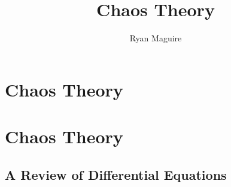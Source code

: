 \documentclass[crop=false,class=book,oneside]{standalone}
\begin{document}
    \newif\ifmathcourseschaostheory
    \ifx\ifmathcourses\undefined
        \title{Chaos Theory}
        \author{Ryan Maguire}
        \date{\vspace{-5ex}}
        \maketitle
        \tableofcontents
        \chapter*{Chaos Theory}
        \setcounter{chapter}{1}
    \else
        \chapter{Chaos Theory}
    \fi 
    \section{A Review of Differential Equations}
\end{document}

